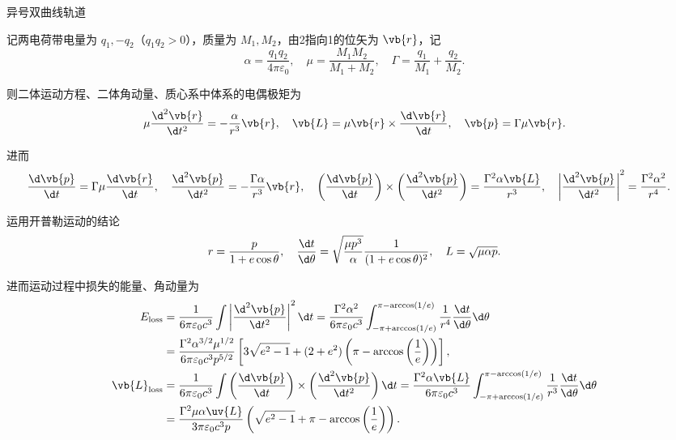 \begin{example}
	异号双曲线轨道

	记两电荷带电量为 \(q_1, -q_2\)（\(q_1 q_2 > 0\)），质量为 \(M_1, M_2\)，由2指向1的位矢为 \(\vb{r}\)，记
	\begin{equation*}
		\alpha = \frac{q_1 q_2}{4\pi\varepsilon_0}, \quad \mu = \frac{M_1 M_2}{M_1 + M_2}, \quad \Gamma = \frac{q_1}{M_1} + \frac{q_2}{M_2}.
	\end{equation*}

	则二体运动方程、二体角动量、质心系中体系的电偶极矩为
	\begin{equation*}
		\mu \frac{\d^2\vb{r}}{\d t^2} = -\frac{\alpha}{r^3}\vb{r}, \quad \vb{L} = \mu \vb{r} \times \frac{\d \vb{r}}{\d t}, \quad \vb{p} = \Gamma \mu \vb{r}.
	\end{equation*}

	进而
	\begin{align*}
		\frac{\d \vb{p}}{\d t} &= \Gamma \mu \frac{\d \vb{r}}{\d t}, \quad \frac{\d^2\vb{p}}{\d t^2} = -\frac{\Gamma \alpha}{r^3}\vb{r}, \quad
		\left( \frac{\d \vb{p}}{\d t} \right) \times \left( \frac{\d^2\vb{p}}{\d t^2} \right) = \frac{\Gamma^2 \alpha \vb{L}}{r^3}, \quad \left| \frac{\d^2\vb{p}}{\d t^2} \right|^2 = \frac{\Gamma^2 \alpha^2}{r^4}.
	\end{align*}

	运用开普勒运动的结论
	\begin{equation*}
		r = \frac{p}{1 + e\cos\theta}, \quad \frac{\d t}{\d \theta} = \sqrt{\frac{\mu p^3}{\alpha}} \frac{1}{(1 + e\cos\theta)^2}, \quad L = \sqrt{\mu\alpha p}.
	\end{equation*}

	进而运动过程中损失的能量、角动量为
	\begin{align*}
		E_{\text{loss}} &= \frac{1}{6\pi\varepsilon_0 c^3} \int \left| \frac{\d^2\vb{p}}{\d t^2} \right|^2 \d t = \frac{\Gamma^2 \alpha^2}{6\pi\varepsilon_0 c^3} \int_{-\pi + \arccos(1/e)}^{\pi - \arccos(1/e)} \frac{1}{r^4} \frac{\d t}{\d \theta} \d \theta \\
		&= \frac{\Gamma^2 \alpha^{3/2} \mu^{1/2}}{6\pi\varepsilon_0 c^3 p^{5/2}} \left[ 3\sqrt{e^2 - 1} + (2 + e^2)\left( \pi - \arccos\left( \frac{1}{e} \right) \right) \right], \\
		\vb{L}_{\text{loss}} &= \frac{1}{6\pi\varepsilon_0 c^3} \int\left( \frac{\d \vb{p}}{\d t} \right) \times \left( \frac{\d^2\vb{p}}{\d t^2} \right) \d t= \frac{\Gamma^2 \alpha \vb{L}}{6\pi\varepsilon_0 c^3} \int_{-\pi + \arccos(1/e)}^{\pi - \arccos(1/e)} \frac{1}{r^3} \frac{\d t}{\d \theta} \d \theta \\
		&= \frac{\Gamma^2 \mu \alpha \uv{L}}{3\pi\varepsilon_0 c^3 p} \left( \sqrt{e^2 - 1} + \pi - \arccos\left( \frac{1}{e} \right) \right).
	\end{align*}
\end{example}

